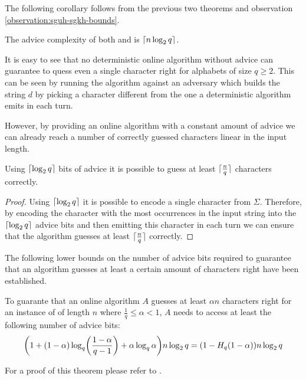 The following corollary follows from the previous two theorems and
observation \ref{observation:sguh-sgkh-bounds}.

\begin{corollary}
    The advice complexity of both  and  is $\lceil n \log_2
    q\rceil$.
\end{corollary}

It is easy to see that no deterministic online algorithm without advice
can guarantee to quess even a single character right for alphabets of size
$q \geq 2$. This can be seen by running the algorithm against an adversary
which builds the string $d$ by picking a character different from the one
a deterministic algorithm emits in each turn.

However, by providing an online algorithm with a constant amount of advice
we can already reach a number of correctly guessed characters linear in
the input length.

\begin{theorem}
    Using $\lceil\log_2 q\rceil$ bits of advice it is possible to guess at least
    $\lceil\frac{n}{q}\rceil$ characters correctly.
\end{theorem}

\begin{proof}
    Using $\lceil\log_2 q\rceil$ it is possible to encode a single character from
    $\Sigma$. Therefore, by encoding the character with the most
    occurrences in the input string into the $\lceil\log_2 q\rceil$ advice bits
    and then emitting this character in each turn we can ensure that the
    algorithm guesses at least $\lceil\frac{n}{q}\rceil$ correctly.
\end{proof}

The following lower bounds on the number of advice bits required to
guarantee that an algorithm guesses at least a certain amount of
characters right have been established.

\begin{theorem}\label{theorem:sguh-lower-ratio}\label{theorem:sgkh-lower-ratio}
    To guarante that an online algorithm $A$ guesses at least $\alpha{}n$
    characters right for an instance of  of length $n$ where
    $\frac{1}{q} \leq \alpha < 1$, $A$ needs to access at least the
    following number of advice bits:
    $$
        \paren*{1 + (1 - \alpha)\log_q\paren*{\frac{1 - \alpha}{q - 1}} +
        \alpha\log_q\alpha} n\lg{}q
        =
        (1 - H_q (1 - \alpha)) n\lg{}q
    $$
\end{theorem}

For a proof of this theorem please refer to \cite{string-guessing}.

